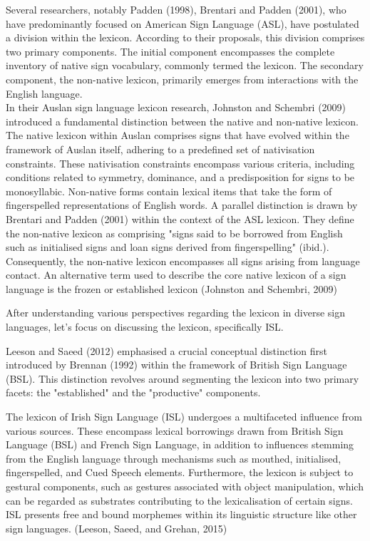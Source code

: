 Several researchers, notably Padden (1998), Brentari and Padden (2001), who have predominantly focused on American Sign Language (ASL), have postulated a division within the lexicon. According to their proposals, this division comprises two primary components. The initial component encompasses the complete inventory of native sign vocabulary, commonly termed the lexicon. The secondary component, the non-native lexicon, primarily emerges from interactions with the English language. \\

In their Auslan sign language lexicon research, Johnston and Schembri (2009) introduced a fundamental distinction between the native and non-native lexicon. The native lexicon within Auslan comprises signs that have evolved within the framework of Auslan itself, adhering to a predefined set of nativisation constraints. These nativisation constraints encompass various criteria, including conditions related to symmetry, dominance, and a predisposition for signs to be monosyllabic. Non-native forms contain lexical items that take the form of fingerspelled representations of English words. A parallel distinction is drawn by Brentari and Padden (2001) within the context of the ASL lexicon. They define the non-native lexicon as comprising "signs said to be borrowed from English such as initialised signs and loan signs derived from fingerspelling" (ibid.). Consequently, the non-native lexicon encompasses all signs arising from language contact. An alternative term used to describe the core native lexicon of a sign language is the frozen or established lexicon (Johnston and Schembri, 2009)  

After understanding various perspectives regarding the lexicon in diverse sign languages, let's focus on discussing the lexicon, specifically ISL.

Leeson and Saeed (2012) emphasised a crucial conceptual distinction first introduced by Brennan (1992) within the framework of British Sign Language (BSL). This distinction revolves around segmenting the lexicon into two primary facets: the "established" and the "productive" components. 

The lexicon of Irish Sign Language (ISL) undergoes a multifaceted influence from various sources. These encompass lexical borrowings drawn from British Sign Language (BSL) and French Sign Language, in addition to influences stemming from the English language through mechanisms such as mouthed, initialised, fingerspelled, and Cued Speech elements. Furthermore, the lexicon is subject to gestural components, such as gestures associated with object manipulation, which can be regarded as substrates contributing to the lexicalisation of certain signs. ISL presents free and bound morphemes within its linguistic structure like other sign languages. (Leeson, Saeed, and Grehan, 2015)\\


